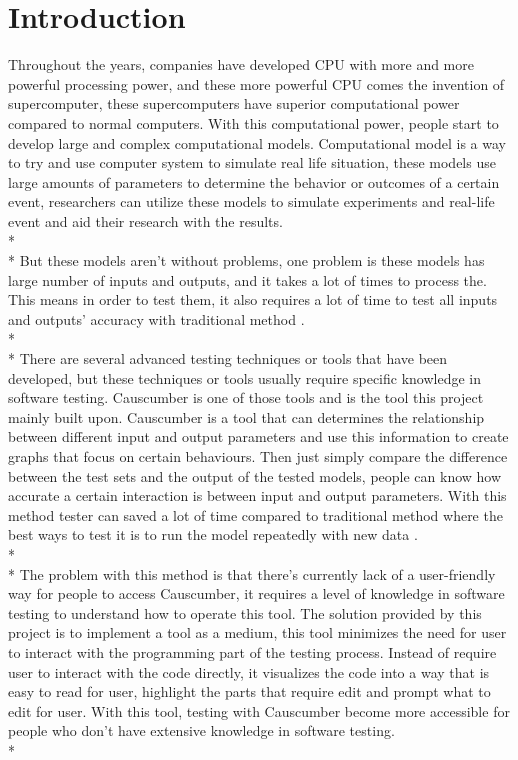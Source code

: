 \chapter{Introduction}
Throughout the years, companies have developed CPU with more and more powerful processing power, and these more powerful CPU comes the invention of supercomputer, these supercomputers have superior computational power compared to normal computers. With this computational power, people start to develop large and complex computational models. Computational model is a way to try and use computer system to simulate real life situation, these models use large amounts of parameters to determine the behavior or outcomes of a certain event, researchers can utilize these models to simulate experiments and real-life event \cite{Reference1} and aid their research with the results.\\*\\*
But these models aren’t without problems, one problem is these models has large number of inputs and outputs, and it takes a lot of times to process the. This means in order to test them, it also requires a lot of time to test all inputs and outputs’ accuracy with traditional method \cite{Reference2}. \\*\\*
There are several advanced testing techniques or tools that have been developed, but these techniques or tools usually require specific knowledge in software testing. Causcumber is one of those tools and is the tool this project mainly built upon. Causcumber is a tool that can determines the relationship between different input and output parameters and use this information to create graphs that focus on certain behaviours. Then just simply compare the difference between the test sets and the output of the tested models, people can know how accurate a certain interaction is between input and output parameters. With this method tester can saved a lot of time compared to traditional method where the best ways to test it is to run the model repeatedly with new data \cite{Reference3}. \\*\\*
The problem with this method is that there’s currently lack of a user-friendly way for people to access Causcumber, it requires a level of knowledge in software testing to understand how to operate this tool. The solution provided by this project is to implement a tool as a medium, this tool minimizes the need for user to interact with the programming part of the testing process. Instead of require user to interact with the code directly, it visualizes the code into a way that is easy to read for user, highlight the parts that require edit and prompt what to edit for user. With this tool, testing with Causcumber become more accessible for people who don’t have extensive knowledge in software testing. \\*\\

